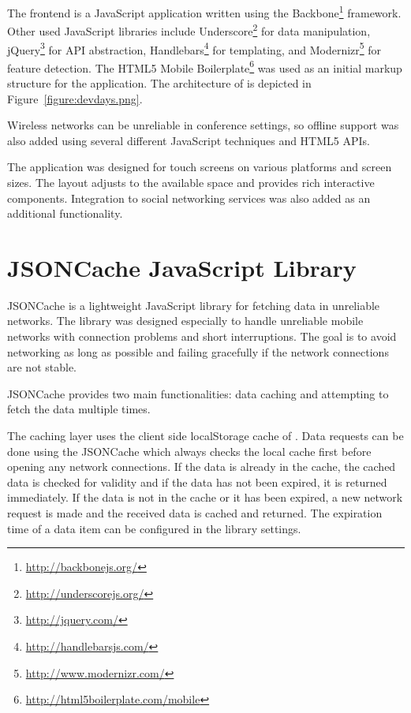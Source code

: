 The frontend is a JavaScript application written using the
Backbone\footnote{\url{http://backbonejs.org/}} 
framework. Other used JavaScript libraries include
Underscore\footnote{\url{http://underscorejs.org/}} for data
manipulation, jQuery\footnote{\url{http://jquery.com/}} for 
API abstraction, Handlebars\footnote{\url{http://handlebarsjs.com/}}
for templating, and
Modernizr\footnote{\url{http://www.modernizr.com/}} for feature
detection. The HTML5 Mobile
Boilerplate\footnote{\url{http://html5boilerplate.com/mobile}} was
used as an initial markup structure for the application. The
architecture of is depicted in Figure~\ref{figure:devdays.png}.

Wireless networks can be unreliable in conference settings, so offline
support was also added using several different JavaScript techniques
and HTML5 APIs.

The application was designed for touch screens on various platforms
and screen sizes. The layout adjusts to the available space and
provides rich interactive components. Integration to social networking
services was also added as an additional functionality.


\section{JSONCache JavaScript Library}
\label{section:jsoncache}

JSONCache is a lightweight JavaScript library for fetching 
data in unreliable networks. The library was designed especially to
handle unreliable mobile networks with connection problems and short
interruptions. The goal is to avoid networking as long as possible and
failing gracefully if the network connections are not stable.

JSONCache provides two main functionalities: data caching and
attempting to fetch the data multiple times.

The caching layer uses the client side localStorage \citationneeded
cache of . Data requests can be done using the JSONCache
 which always checks the local cache first before opening
any network connections. If the data is already in the cache, the
cached data is checked for validity and if the data has not been
expired, it is returned immediately. If the data is not in the cache
or it has been expired, a new network request is made and the received
data is cached and returned. The expiration time of a data item can be
configured in the library settings.

